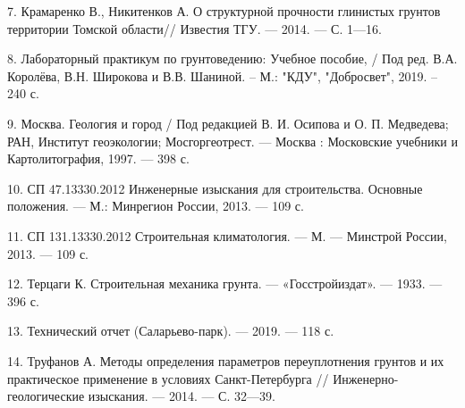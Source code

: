 7. Крамаренко В., Никитенков А. О структурной прочности глинистых грунтов
территории Томской области// Известия ТГУ. --- 2014. ---
С. 1---16.

8. Лабораторный практикум по грунтоведению: Учебное пособие, / Под ред. В.А. Королёва, 
В.Н. Широкова и В.В. Шаниной. – М.: "КДУ", "Добросвет", 2019. – 240 с.

9. Москва. Геология и город / Под редакцией В. И. Осипова и О. П. Медведева; 
РАН, Институт геоэкологии; Мосгоргеотрест. --- Москва : Московские учебники 
и Картолитография, 1997. --- 398 с.

10. СП 47.13330.2012 Инженерные изыскания для строительства. 
Основные положения. --- М.: Минрегион России, 2013. --- 109 с.

11. СП 131.13330.2012 Строительная климатология. --- М. --- Минстрой России, 2013. --- 109 с.

12. Терцаги К. Строительная механика грунта. --- «Госстройиздат». ---
1933. --- 396 с.

13. Технический отчет (Саларьево-парк). --- 2019. --- 118 с.

14. Труфанов А. Методы определения параметров переуплотнения грунтов и
их практическое применение в условиях Санкт-Петербурга // Инженерно-
геологические изыскания. --- 2014. --- С. 32---39.